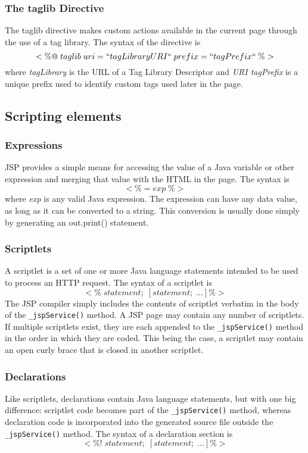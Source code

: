 \subsubsection{The taglib Directive}
The taglib directive makes custom actions available in the current page through the use of a tag library. The syntax of the directive is
$$<\%@\;taglib\;uri=``tagLibraryURI``\;prefix=``tagPrefix``\;\%>$$ where \emph{tagLibrary} is the URL of a Tag Library Descriptor and \emph{URI tagPrefix} is a unique prefix used to identify custom tags used later in the page.


\subsection{Scripting elements}
\subsubsection{Expressions}
JSP provides a simple means for accessing the value of a Java variable or other expression and merging that value with the HTML in the page. The syntax is
$$<\%=exp\;\%>$$
where \emph{exp} is any valid Java expression. The expression can have any data value, as long as it can be converted to a string. This conversion is usually done simply by generating an out.print() statement.


\subsubsection{Scriptlets}
A scriptlet is a set of one or more Java language statements intended to be used to process an HTTP request. The syntax of a scriptlet is
$$<\%\;statement;\;[statement;\;...]\%>$$
The JSP compiler simply includes the contents of scriptlet verbatim in the body of the \texttt{\_jspService()} method. A JSP page may contain any number of scriptlets. If multiple scriptlets exist, they are each appended to the \texttt{\_jspService()} method in the order in which they are coded. This being the case, a scriptlet may contain an open curly brace that is closed in another scriptlet.

\subsubsection{Declarations}
Like scriptlets, declarations contain Java language statements, but with one big difference: scriptlet code becomes part of the \texttt{\_jspService()} method, whereas declaration code is incorporated into the generated source file outside the \texttt{\_jspService()} method. The syntax of a declaration section is
$$<\%!\;statement;\;[statement;\;...]\%>$$


